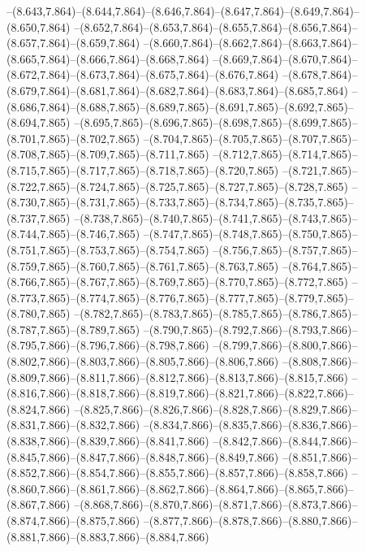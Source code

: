   --(8.643,7.864)--(8.644,7.864)--(8.646,7.864)--(8.647,7.864)--(8.649,7.864)--(8.650,7.864)%
  --(8.652,7.864)--(8.653,7.864)--(8.655,7.864)--(8.656,7.864)--(8.657,7.864)--(8.659,7.864)%
  --(8.660,7.864)--(8.662,7.864)--(8.663,7.864)--(8.665,7.864)--(8.666,7.864)--(8.668,7.864)%
  --(8.669,7.864)--(8.670,7.864)--(8.672,7.864)--(8.673,7.864)--(8.675,7.864)--(8.676,7.864)%
  --(8.678,7.864)--(8.679,7.864)--(8.681,7.864)--(8.682,7.864)--(8.683,7.864)--(8.685,7.864)%
  --(8.686,7.864)--(8.688,7.865)--(8.689,7.865)--(8.691,7.865)--(8.692,7.865)--(8.694,7.865)%
  --(8.695,7.865)--(8.696,7.865)--(8.698,7.865)--(8.699,7.865)--(8.701,7.865)--(8.702,7.865)%
  --(8.704,7.865)--(8.705,7.865)--(8.707,7.865)--(8.708,7.865)--(8.709,7.865)--(8.711,7.865)%
  --(8.712,7.865)--(8.714,7.865)--(8.715,7.865)--(8.717,7.865)--(8.718,7.865)--(8.720,7.865)%
  --(8.721,7.865)--(8.722,7.865)--(8.724,7.865)--(8.725,7.865)--(8.727,7.865)--(8.728,7.865)%
  --(8.730,7.865)--(8.731,7.865)--(8.733,7.865)--(8.734,7.865)--(8.735,7.865)--(8.737,7.865)%
  --(8.738,7.865)--(8.740,7.865)--(8.741,7.865)--(8.743,7.865)--(8.744,7.865)--(8.746,7.865)%
  --(8.747,7.865)--(8.748,7.865)--(8.750,7.865)--(8.751,7.865)--(8.753,7.865)--(8.754,7.865)%
  --(8.756,7.865)--(8.757,7.865)--(8.759,7.865)--(8.760,7.865)--(8.761,7.865)--(8.763,7.865)%
  --(8.764,7.865)--(8.766,7.865)--(8.767,7.865)--(8.769,7.865)--(8.770,7.865)--(8.772,7.865)%
  --(8.773,7.865)--(8.774,7.865)--(8.776,7.865)--(8.777,7.865)--(8.779,7.865)--(8.780,7.865)%
  --(8.782,7.865)--(8.783,7.865)--(8.785,7.865)--(8.786,7.865)--(8.787,7.865)--(8.789,7.865)%
  --(8.790,7.865)--(8.792,7.866)--(8.793,7.866)--(8.795,7.866)--(8.796,7.866)--(8.798,7.866)%
  --(8.799,7.866)--(8.800,7.866)--(8.802,7.866)--(8.803,7.866)--(8.805,7.866)--(8.806,7.866)%
  --(8.808,7.866)--(8.809,7.866)--(8.811,7.866)--(8.812,7.866)--(8.813,7.866)--(8.815,7.866)%
  --(8.816,7.866)--(8.818,7.866)--(8.819,7.866)--(8.821,7.866)--(8.822,7.866)--(8.824,7.866)%
  --(8.825,7.866)--(8.826,7.866)--(8.828,7.866)--(8.829,7.866)--(8.831,7.866)--(8.832,7.866)%
  --(8.834,7.866)--(8.835,7.866)--(8.836,7.866)--(8.838,7.866)--(8.839,7.866)--(8.841,7.866)%
  --(8.842,7.866)--(8.844,7.866)--(8.845,7.866)--(8.847,7.866)--(8.848,7.866)--(8.849,7.866)%
  --(8.851,7.866)--(8.852,7.866)--(8.854,7.866)--(8.855,7.866)--(8.857,7.866)--(8.858,7.866)%
  --(8.860,7.866)--(8.861,7.866)--(8.862,7.866)--(8.864,7.866)--(8.865,7.866)--(8.867,7.866)%
  --(8.868,7.866)--(8.870,7.866)--(8.871,7.866)--(8.873,7.866)--(8.874,7.866)--(8.875,7.866)%
  --(8.877,7.866)--(8.878,7.866)--(8.880,7.866)--(8.881,7.866)--(8.883,7.866)--(8.884,7.866)%
